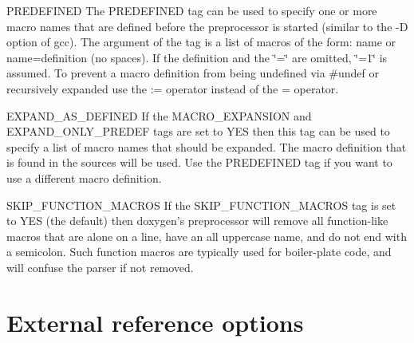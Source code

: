 \begin{DoxyDescription}
\item[{\ttfamily PREDEFINED} ] The {\ttfamily PREDEFINED} tag can be used to specify one or more macro names that are defined before the preprocessor is started (similar to the -\/D option of gcc). The argument of the tag is a list of macros of the form: {\ttfamily name} or {\ttfamily name=definition} (no spaces). If the definition and the \char`\"{}=\char`\"{} are omitted, \char`\"{}=1\char`\"{} is assumed. To prevent a macro definition from being undefined via \#undef or recursively expanded use the := operator instead of the = operator.

\label{config_cfg_expand_as_defined}
\hypertarget{config_cfg_expand_as_defined}{}
 
\item[{\ttfamily EXPAND\_\-AS\_\-DEFINED} ] If the {\ttfamily MACRO\_\-EXPANSION} and {\ttfamily EXPAND\_\-ONLY\_\-PREDEF} tags are set to {\ttfamily YES} then this tag can be used to specify a list of macro names that should be expanded. The macro definition that is found in the sources will be used. Use the {\ttfamily PREDEFINED} tag if you want to use a different macro definition.

\label{config_cfg_skip_function_macros}
\hypertarget{config_cfg_skip_function_macros}{}
 
\item[{\ttfamily SKIP\_\-FUNCTION\_\-MACROS} ] If the {\ttfamily SKIP\_\-FUNCTION\_\-MACROS} tag is set to {\ttfamily YES} (the default) then doxygen's preprocessor will remove all function-\/like macros that are alone on a line, have an all uppercase name, and do not end with a semicolon. Such function macros are typically used for boiler-\/plate code, and will confuse the parser if not removed.


\end{DoxyDescription}\hypertarget{config_config_extref}{}\section{External reference options}\label{config_config_extref}
\label{config_cfg_tagfiles}
\hypertarget{config_cfg_tagfiles}{}
 
